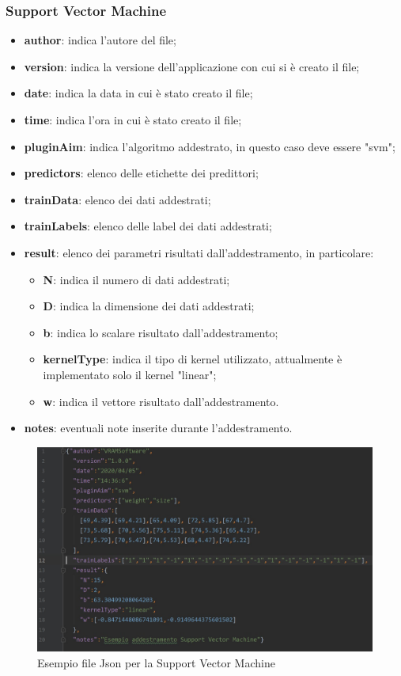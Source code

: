 		\subsubsection{Support Vector Machine}
			\begin{itemize}
				\item \textbf{author}: indica l'autore del file;
				\item \textbf{version}: indica la versione dell'applicazione con cui si è creato il file;
				\item \textbf{date}: indica la data in cui è stato creato il file;
				\item \textbf{time}: indica l'ora in cui è stato creato il file;
				\item \textbf{pluginAim}: indica l'algoritmo addestrato, in questo caso deve essere "svm";
				\item \textbf{predictors}: elenco delle etichette dei predittori;
				\item \textbf{trainData}: elenco dei dati addestrati;
				\item \textbf{trainLabels}: elenco delle label dei dati addestrati;
				\item \textbf{result}: elenco dei parametri risultati dall'addestramento, in particolare:
				\begin{itemize}
					\item \textbf{N}: indica il numero di dati addestrati;
					\item \textbf{D}: indica la dimensione dei dati addestrati;
					\item \textbf{b}: indica lo scalare risultato dall'addestramento;
					\item \textbf{kernelType}: indica il tipo di kernel utilizzato, attualmente è implementato solo il kernel "linear";
					\item \textbf{w}: indica il vettore risultato dall'addestramento.					
				\end{itemize}
				\item \textbf{notes}: eventuali note inserite durante l'addestramento.
			\end{itemize}
		\mbox{}
		\begin{figure} [H]
			\begin{center}
				\includegraphics[width=\linewidth]{./img/jsonSvm.jpg}
			\end{center}
			\caption{Esempio file Json per la Support Vector Machine}
		\end{figure}
